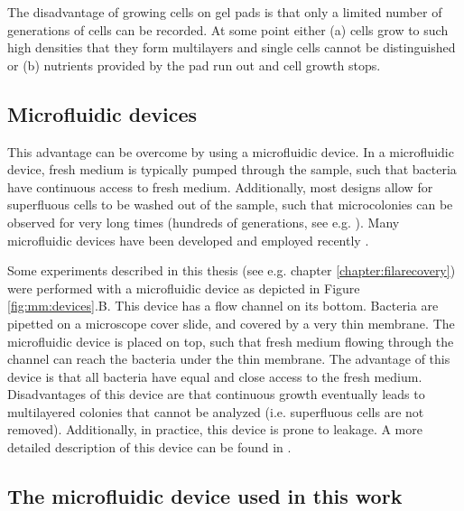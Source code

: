 The disadvantage of growing cells on gel pads is that only a limited number of generations of cells can be recorded.
At some point either (a) cells grow to such high densities that they form multilayers and single cells cannot be distinguished or (b) nutrients provided by the pad run out and cell growth stops.

\subsection{Microfluidic devices}

This advantage can be overcome by using a microfluidic device.
In a microfluidic device, fresh medium is typically pumped through the sample, such that bacteria have continuous access to fresh medium. Additionally, most designs allow for superfluous cells to be washed out of the sample, such that microcolonies can be observed for very long times (hundreds of generations, see e.g. \cite{Wang2010}).
%
Many microfluidic devices have been developed and employed recently \cite{Locke2009, Hammar2014, Hansen2015, Bennett2010, Nanatani2015, Hashimoto2016, Lambert2014, Ullman2013, Young2013, Ferry2011, Wang2010}.

Some experiments described in this thesis (see e.g. chapter \ref{chapter:filarecovery}) were performed with a microfluidic device as depicted in Figure \ref{fig:mm:devices}.B.
This device has a flow channel on its bottom. Bacteria are pipetted on a microscope cover slide, and covered by a very thin membrane. The microfluidic device is placed on top, such that fresh medium flowing through the channel can reach the bacteria under the thin membrane.
The advantage of this device is that all bacteria have equal and close access to the fresh medium. Disadvantages of this device are that continuous growth eventually leads to multilayered colonies that cannot be analyzed (i.e. superfluous cells are not removed).
Additionally, in practice, this device is prone to leakage.
A more detailed description of this device can be found in \cite{Boulineau2013}.

\subsection{The microfluidic device used in this work}

